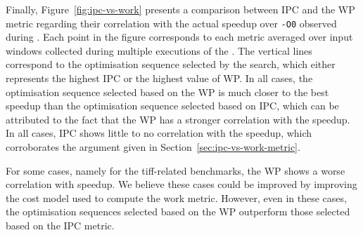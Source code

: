 

Finally, Figure~\ref{fig:ipc-vs-work} presents a comparison between IPC and the WP metric regarding their correlation with the actual speedup over \verb|-O0| observed during {\itercomp}.
Each point in the figure corresponds to each metric averaged over input windows collected during multiple executions of the {\itercomp}.
The vertical lines correspond to the optimisation sequence selected by the {\itercomp} search, which either represents the highest IPC or the highest value of WP.
In all cases, the optimisation sequence selected based on the WP is much closer to the best speedup than the optimisation sequence selected based on IPC, which can be attributed to the fact that the WP has a stronger correlation with the speedup.
In all cases, IPC shows little to no correlation with the speedup, which corroborates the argument given in Section~\ref{sec:ipc-vs-work-metric}.

For some cases, namely for the tiff-related benchmarks, the WP shows a worse correlation with speedup.
We believe these cases could be improved by improving the cost model used to compute the work metric.
However, even in these cases, the optimisation sequences selected based on the WP outperform those selected based on the IPC metric.


